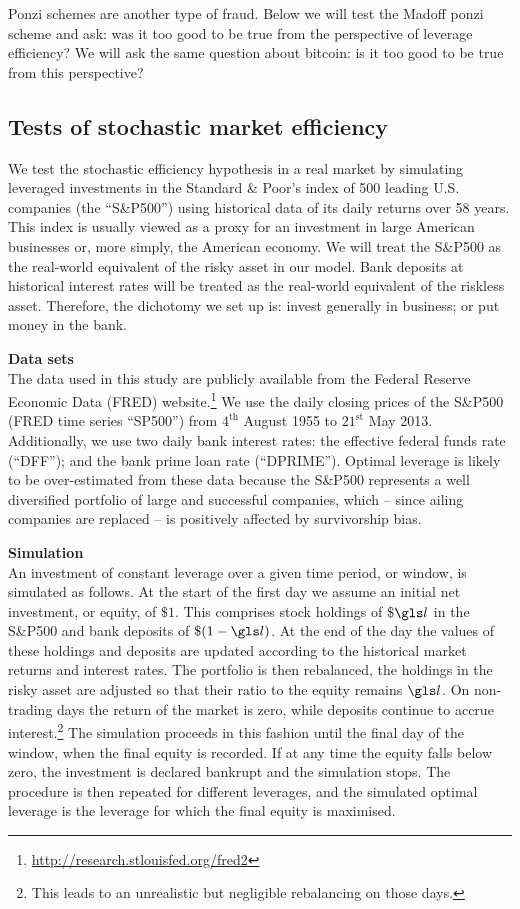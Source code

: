 Ponzi schemes are another type of fraud. Below we will test the Madoff ponzi scheme and ask: was it too good to be true from the perspective of leverage efficiency? We will ask the same question about bitcoin: is it too good to be true from this perspective?

\subsection{Tests of stochastic market efficiency}
We test the stochastic efficiency hypothesis in a real market by simulating leveraged investments in the Standard \& Poor's index of 500 leading U.S. companies (the ``S\&P500'') using historical data of its daily returns over 58 years. This index is usually viewed as a proxy for an investment in large American businesses or, more simply, the American economy. We will treat the S\&P500 as the real-world equivalent of the risky asset in our model. Bank deposits at historical interest rates will be treated as the real-world equivalent of the riskless asset. Therefore, the dichotomy we set up is: invest generally in business; or put money in the bank.

\textbf{Data sets}\\
The data used in this study are publicly available from the Federal Reserve Economic Data (FRED) website.\footnote{\url{http://research.stlouisfed.org/fred2}} We use the daily closing prices of the S\&P500 (FRED time series ``SP500'') from $4^{\text{th}}$ August 1955 to $21^{\text{st}}$ May 2013. Additionally, we use two daily bank interest rates: the effective federal funds rate (``DFF''); and the bank prime loan rate (``DPRIME''). Optimal leverage is likely to be over-estimated from these data because the S\&P500 represents a well diversified portfolio of large and successful companies, which -- since ailing companies are replaced -- is positively affected by survivorship bias.

\textbf{Simulation}\\
An investment of constant leverage over a given time period, or window, is simulated as follows. At the start of the first day we assume an initial net investment, or equity, of $\$1$. This comprises stock holdings of $\$\l$ in the S\&P500 and bank deposits of $\$(1-\l)$. At the end of the day the values of these holdings and deposits are updated according to the historical market returns and interest rates. The portfolio is then rebalanced, \ie the holdings in the risky asset are adjusted so that their ratio to the equity remains $\l$. On non-trading days the return of the market is zero, while deposits continue to accrue interest.\footnote{This leads to an unrealistic but negligible rebalancing on those days.} The simulation proceeds in this fashion until the final day of the window, when the final equity is recorded. If at any time the equity falls below zero, the investment is declared bankrupt and the simulation stops.  The procedure is then repeated for different leverages, and the simulated optimal leverage is the leverage for which the final equity is maximised.

